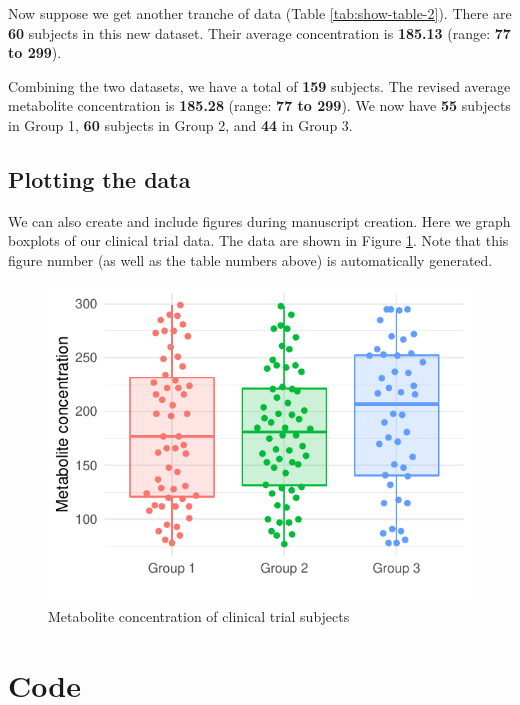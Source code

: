 \documentclass[smallextended]{svjour3}       %
\begin{document}
Now suppose we get another tranche of data (Table \ref{tab:show-table-2}). There are \textbf{60} subjects in this new dataset. Their average concentration is \textbf{185.13} (range: \textbf{77 to 299}).

Combining the two datasets, we have a total of \textbf{159} subjects. The revised average metabolite concentration is \textbf{185.28} (range: \textbf{77 to 299}). We now have \textbf{55} subjects in Group 1, \textbf{60} subjects in Group 2, and \textbf{44} in Group 3.

\hypertarget{sec:3}{%
\subsection{Plotting the data}\label{sec:3}}

We can also create and include figures during manuscript creation. Here we graph boxplots of our clinical trial data. The data are shown in Figure \ref{fig:plot-data}. Note that this figure number (as well as the table numbers above) is automatically generated.

\begin{figure}
\centering
\includegraphics{computed_manuscript_files/figure-latex/plot-data-1.pdf}
\caption{\label{fig:plot-data}Metabolite concentration of clinical trial subjects}
\end{figure}

\newpage

\hypertarget{code}{%
\section{Code}\label{code}}
\end{document}
